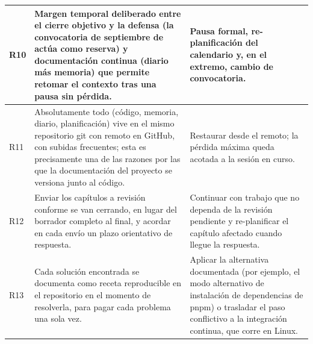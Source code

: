 \documentclass[11pt,a4paper]{article}
\begin{document}
{\begin{longtable}{|>{\RaggedRight\arraybackslash}p{0.8cm}|>{\RaggedRight\arraybackslash}p{6.9cm}|>{\RaggedRight\arraybackslash}p{6.9cm}|}
R10 & Margen temporal deliberado entre el cierre objetivo y la defensa (la convocatoria de septiembre de \thesisYear{} actúa como reserva) y documentación continua (diario más memoria) que permite retomar el contexto tras una pausa sin pérdida. & Pausa formal, re-planificación del calendario y, en el extremo, cambio de convocatoria. \\ \hline

R11 & Absolutamente todo (código, memoria, diario, planificación) vive en el mismo repositorio git con remoto en GitHub, con subidas frecuentes; esta es precisamente una de las razones por las que la documentación del proyecto se versiona junto al código. & Restaurar desde el remoto; la pérdida máxima queda acotada a la sesión en curso. \\ \hline

R12 & Enviar los capítulos a revisión conforme se van cerrando, en lugar del borrador completo al final, y acordar en cada envío un plazo orientativo de respuesta. & Continuar con trabajo que no dependa de la revisión pendiente y re-planificar el capítulo afectado cuando llegue la respuesta. \\ \hline

R13 & Cada solución encontrada se documenta como receta reproducible en el repositorio en el momento de resolverla, para pagar cada problema una sola vez. & Aplicar la alternativa documentada (por ejemplo, el modo alternativo de instalación de dependencias de pnpm) o trasladar el paso conflictivo a la integración continua, que corre en Linux. \\ \hline

\end{longtable}
}
\end{document}
